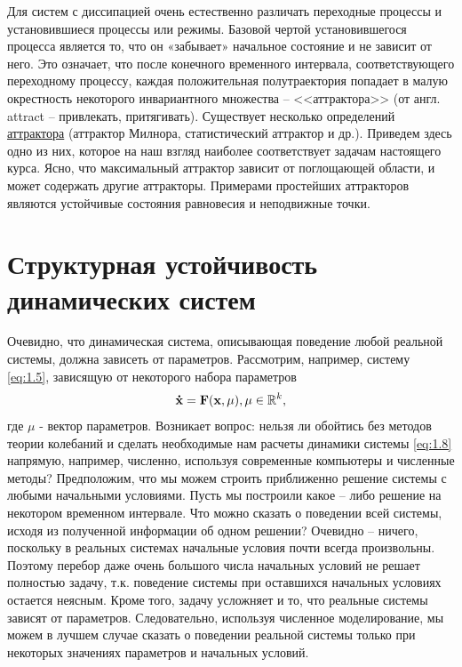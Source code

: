 Для систем с диссипацией очень естественно различать переходные процессы и установившиеся процессы или режимы. Базовой чертой установившегося процесса является то, что он «забывает» начальное состояние и не зависит от него. Это означает, что после конечного временного интервала, соответствующего переходному процессу, каждая положительная
полутраектория попадает в малую окрестность некоторого инвариантного множества – <<аттрактора>> (от англ. attract – привлекать, притягивать). Существует несколько определений \href{https://ru.wikipedia.org/wiki/%D0%90%D1%82%D1%82%D1%80%D0%B0%D0%BA%D1%82%D0%BE%D1%80}{аттрактора} (аттрактор Милнора,
статистический аттрактор и др.). Приведем здесь одно из них, которое на наш взгляд наиболее соответствует задачам настоящего курса.
Ясно, что максимальный аттрактор зависит от поглощающей области, и может содержать другие аттракторы. Примерами простейших аттракторов являются устойчивые состояния равновесия и неподвижные точки.


\section{Структурная устойчивость динамических систем} %
Очевидно, что динамическая система, описывающая поведение любой
реальной системы, должна зависеть от параметров. Рассмотрим, например, систему \eqref{eq:1.5}, зависящую от некоторого набора параметров
\begin{equation}
	\label{eq:1.8}
	\mathbf {\dot x} = \mathbf F(\mathbf x, \mathbf \mu), \mu \in \mathbb{R}^k,
\end{equation}
где $\mu$ - вектор параметров. Возникает вопрос: нельзя ли обойтись без методов теории колебаний и сделать необходимые нам расчеты динамики системы \eqref{eq:1.8} напрямую, например, численно, используя современные компьютеры и численные методы? Предположим, что мы можем строить приближенно решение системы с любыми начальными условиями. Пусть мы построили какое
– либо решение на некотором временном интервале. Что можно сказать о поведении всей системы, исходя из полученной информации об одном решении? Очевидно – ничего, поскольку в реальных системах начальные условия почти всегда произвольны. Поэтому перебор даже очень большого числа начальных условий не решает полностью задачу, т.к. поведение системы  при оставшихся начальных условиях остается неясным. Кроме того, задачу
усложняет и то, что реальные системы зависят от параметров. Следовательно, используя численное моделирование, мы можем в лучшем случае сказать о  поведении реальной системы только при некоторых значениях параметров и
начальных условий.

